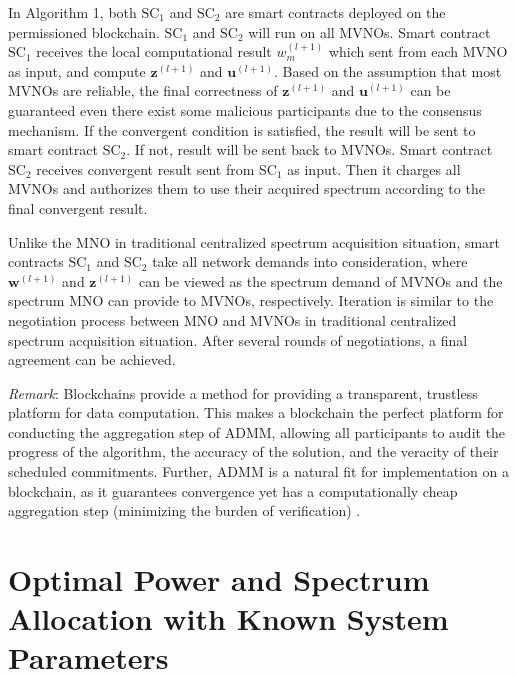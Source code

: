 \documentclass[journal]{IEEEtran}
\begin{document}
{\color{red} In Algorithm 1, both $\mbox{SC}_1$ and $\mbox{SC}_2$ are smart contracts deployed on the permissioned blockchain. $\mbox{SC}_1$ and $\mbox{SC}_2$ will run on all MVNOs. Smart contract $\mbox{SC}_1$ receives the local computational result $w_m^{(l+1)}$ which sent from each MVNO as input, and compute $\mathbf{z}^{(l+1)}$ and $\mathbf{u}^{(l+1)}$. Based on the assumption that most MVNOs are reliable, the final correctness of $\mathbf{z}^{(l+1)}$ and $\mathbf{u}^{(l+1)}$ can be guaranteed even there exist some malicious participants due to the consensus mechanism. If the convergent condition is satisfied, the result will be sent to smart contract $\mbox{SC}_2$. If not, result will be sent back to MVNOs. Smart contract $\mbox{SC}_2$ receives convergent result sent from $\mbox{SC}_1$ as input. Then it charges all MVNOs and authorizes them to use their acquired spectrum according to the final convergent result.
	
Unlike the MNO in traditional centralized spectrum acquisition situation, smart contracts $\mbox{SC}_1$ and $\mbox{SC}_2$ take all network demands into consideration, where $\mathbf{w}^{(l+1)}$ and $\mathbf{z}^{(l+1)}$ can be viewed as the spectrum demand of MVNOs and the spectrum MNO can provide to MVNOs, respectively. Iteration is similar to the negotiation process between MNO and MVNOs in traditional centralized spectrum acquisition situation. After several rounds of negotiations, a final agreement can be achieved.}

\emph{Remark}: Blockchains provide a method for providing a transparent, trustless platform for data computation. This makes a blockchain the perfect platform for conducting the aggregation step of ADMM, allowing all participants to audit the progress of the algorithm, the accuracy of the solution, and the veracity of their scheduled commitments. Further, ADMM is a natural fit for implementation on a blockchain, as it guarantees
convergence yet has a computationally cheap aggregation step (minimizing the burden of verification) \cite{Munsing}.

\section{Optimal Power and Spectrum Allocation with Known System Parameters}
\end{document}
